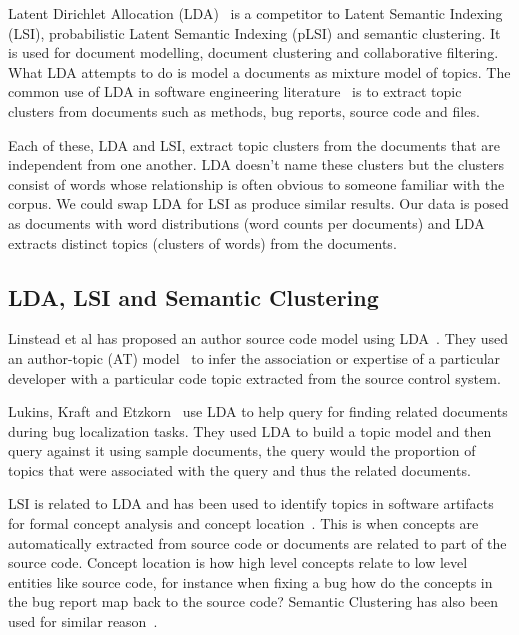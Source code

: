 \documentclass[times, 10pt,twocolumn]{article}
\begin{document}

Latent Dirichlet Allocation (LDA)~\cite{944937} is a competitor to
Latent Semantic Indexing (LSI), probabilistic Latent Semantic Indexing
(pLSI) and semantic clustering. It is used for document modelling,
document clustering and collaborative filtering. What LDA attempts to
do is model a documents as mixture model of topics.  The common use of
LDA in software engineering
literature~\cite{lukins2008,10.1109/MSR.2007.20,NIPS2007637,1321709}
is to extract topic clusters from documents such as methods, bug
reports, source code and files.

Each of these, LDA and LSI, extract topic clusters
from the documents that are independent from one another. LDA doesn't
name these clusters but the clusters consist of words whose
relationship is often obvious to someone familiar with the
corpus. We could swap LDA for LSI as produce similar results. Our data is posed as
documents with word distributions (word counts per documents) and LDA
extracts distinct topics (clusters of words) from the documents.

\subsection{LDA, LSI and Semantic Clustering}

Linstead et al has proposed an author source code model using
LDA~\cite{10.1109/MSR.2007.20,NIPS2007637,1321709}. They used an
author-topic (AT) model~\cite{1036902} to infer the association or
expertise of a particular developer with a particular code topic
extracted from the source control system.

Lukins, Kraft and Etzkorn~\cite{lukins2008} use LDA to help query for
finding related documents during bug localization tasks. They used LDA
to build a topic model and then query against it using sample
documents, the query would the proportion of topics that were
associated with the query and thus the related documents.

LSI is related to LDA and has been used to identify topics in software
artifacts for formal concept analysis and concept
location~\cite{1421013,1374321,10.1109/ICPC.2007.13,10.1109/ICPC.2006.17}.
This is when concepts are automatically extracted from source code or
documents are related to part of the source code.  Concept location is
how high level concepts relate to low level entities like source code,
for instance when fixing a bug how do the concepts in the bug report
map back to the source code?  Semantic Clustering has also been used
for similar reason~\cite{1698774,1566153}.
\end{document}
